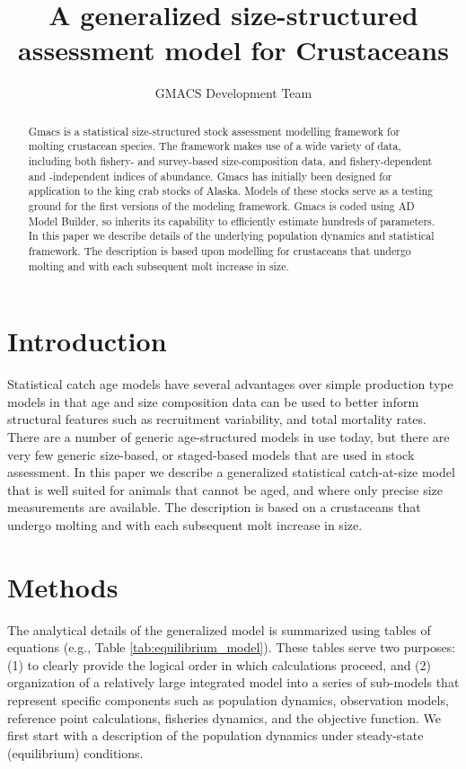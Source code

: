 \documentclass[12pt,letterpaper]{article}
\title{A generalized size-structured assessment model for Crustaceans}
\author{GMACS Development Team}
\begin{document}
  \maketitle

  \begin{abstract}
    Gmacs is a statistical size-structured stock assessment modelling framework for molting crustacean species. The framework makes use of a wide variety of data, including both fishery- and survey-based size-composition data, and fishery-dependent and -independent indices of abundance. Gmacs has initially been designed for application to the king crab stocks of Alaska. Models of these stocks serve as a testing ground for the first versions of the modeling framework. Gmacs is coded using AD Model Builder, so inherits its capability to efficiently estimate hundreds of parameters. In this paper we describe details of the underlying population dynamics and statistical framework. The description is based upon modelling for crustaceans that undergo molting and with each subsequent molt increase in size.

  \end{abstract}


  \section*{Introduction} %
  \label{sec:introduction}

  Statistical catch age models have several advantages over simple production type models in that age and size composition data can be used to better inform structural features such as recruitment variability, and total mortality rates.  There are a number of generic age-structured models in use today, but there are very few generic size-based, or staged-based models that are used in stock assessment. In this paper we describe a generalized statistical catch-at-size model that is well suited for animals that cannot be aged, and where only precise size measurements are available. The description is based on a crustaceans that undergo molting and with each subsequent molt increase in size.


  \section*{Methods} %
  \label{sec:methods}
  The analytical details of the generalized model is summarized using tables of equations (e.g., Table \ref{tab:equilibrium_model}).   These tables serve two purposes: (1) to clearly provide the logical order in which calculations proceed, and (2) organization of a relatively large integrated model into a series of sub-models that represent specific components such as population dynamics, observation models, reference point calculations, fisheries dynamics, and the objective function.  We first start with a description of the population dynamics under steady-state (equilibrium) conditions.  
\end{document}
